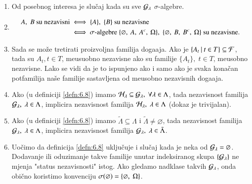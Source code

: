 \begin{nap} \label{nap:6.9}
    \begin{enumerate}[label=(\alph*)]
        \item Od posebnog interesa je slu\v caj kada su sve $\mathcal{G}_{\lambda}$ $\sigma$-algebre.
        \item
        \begin{equation*}
            \begin{aligned}
                A, \; B \textnormal{ su nezavisni} &\iff \{A\}, \; \{B\} \textnormal{ su nezavisne}\\
                &\iff \sigma \textnormal{-algebre } \{ \varnothing, \: A, \: A^c, \: \Omega \}, \; \{ \varnothing, \: B, \: B^c, \: \Omega \} \textnormal{ su nezavisne}.
            \end{aligned}
        \end{equation*}
        \item   \label{nap:6.9c}
        Sada se mo\v ze tretirati proizvoljna familija doga\dj aja.
        Ako je $\{{A_t} \: | \: {t \in T}\} \subseteq \mathcal{F}$, tada su $A_t, t \in T$, me\dj usuobno nezavisne ako su familije $\{A_t\}, \; t \in T$, me\dj usobno nezavisne.
        Lako se vidi da je to ispunjeno ako i samo ako je svaka kona\v can potfamilija na\v se familije sastavljena od me\dj usobno nezavisnih doga\dj aja.
        \item \label{nap:6.9d}
        Ako (u definiciji \ref{defn:6.8}) imamo $\mathcal{H}_\lambda \subseteq \mathcal{G}_\lambda, \; \forall \lambda \in \Lambda$, tada nezavisnost familija $\mathcal{G}_\lambda, \; \lambda \in \Lambda$, implicira nezavisnost familija $\mathcal{H}_\lambda, \; \lambda \in \Lambda$ (dokaz je trivijalan).
        \item Ako (u definiciji \ref{defn:6.8}) imamo $\tilde{\Lambda} \subseteq \Lambda$ i $\tilde{\Lambda} \neq \varnothing$, tada nezavisnost familija $\mathcal{G}_\lambda, \; \lambda \in \Lambda$, implicira nezavisnost familija $\mathcal{G}_\lambda, \; \lambda \in \tilde{\Lambda}$.
        \item \label{nap:6.9f}
        Uo\v cimo da definicija \ref{defn:6.8} uklju\v cuje i slu\v caj kada je neka od $\mathcal{G}_\lambda = \varnothing$.
        Dodavanje ili oduzimanje takve familije unutar indeksiranog skupa $\{\mathcal{G}_\lambda\}$ ne mjenja "status nezavisnosti" istog.
        Ako gledamo nadklase takvih $\mathcal{G}_\lambda$, onda obi\v cno koristimo konvenciju $\sigma({\varnothing}) = \{ \varnothing, \; \Omega\}$.
    \end{enumerate}
\end{nap}


